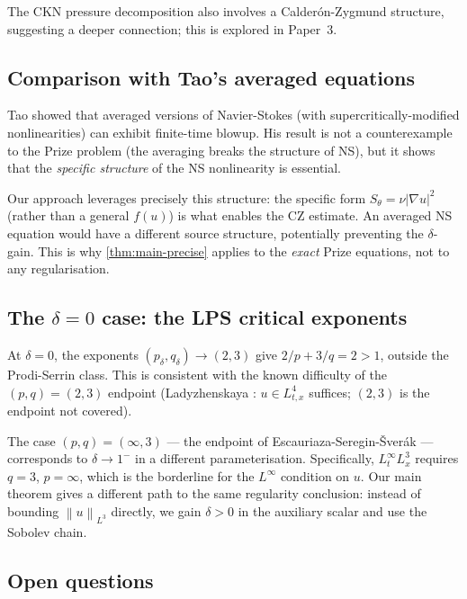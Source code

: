 \documentclass[12pt]{article}
\theoremstyle{plain}
\theoremstyle{definition}
\theoremstyle{remark}
\newcommand{\norm}[1]{\left\|#1\right\|}
\newcommand{\abs}[1]{\left|#1\right|}
\newcommand{\grad}{\nabla}
\begin{document}
The CKN pressure decomposition also involves a Calderón-Zygmund structure,
suggesting a deeper connection; this is explored in Paper~3.

\subsection{Comparison with Tao's averaged equations}

Tao \cite{Tao2016} showed that averaged versions of Navier-Stokes (with
supercritically-modified nonlinearities) can exhibit finite-time blowup.
His result is not a counterexample to the Prize problem (the averaging
breaks the structure of NS), but it shows that the \emph{specific structure}
of the NS nonlinearity is essential.

Our approach leverages precisely this structure: the specific form
$S_\theta=\nu\abs{\grad u}^2$ (rather than a general $f(u)$) is what
enables the CZ estimate.
An averaged NS equation would have a different source structure,
potentially preventing the $\delta$-gain.
This is why \cref{thm:main-precise} applies to the \emph{exact} Prize equations,
not to any regularisation.

\subsection{The $\delta=0$ case: the LPS critical exponents}

At $\delta=0$, the exponents $(p_\delta,q_\delta)\to(2,3)$ give
$2/p+3/q=2>1$, outside the Prodi-Serrin class.
This is consistent with the known difficulty of the $(p,q)=(2,3)$ endpoint
(Ladyzhenskaya \cite{Ladyzhenskaya1967}: $u\in L^4_{t,x}$ suffices;
$(2,3)$ is the endpoint not covered).

The case $(p,q)=(\infty,3)$ — the endpoint of Escauriaza-Seregin-\v{S}ver\'ak
\cite{ESS2003} — corresponds to $\delta\to 1^-$ in a different parameterisation.
Specifically, $L^\infty_t L^3_x$ requires $q=3$, $p=\infty$, which is the
borderline for the $L^\infty$ condition on $u$.
Our main theorem gives a different path to the same regularity conclusion:
instead of bounding $\norm{u}_{L^3}$ directly, we gain $\delta>0$ in the
auxiliary scalar and use the Sobolev chain.

\subsection{Open questions}
\end{document}
